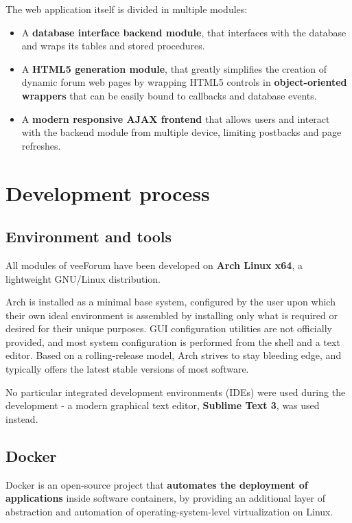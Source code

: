 \documentclass[12pt]{report}
\newcommand{\+}{\discretionary{\mbox{\scriptsize$\hookleftarrow$}}{}{}}
\renewcommand\emph{\textbf}
\begin{document}
        The web application itself is divided in multiple modules:
        \begin{itemize}
            \item A \emph{database interface backend module}, that interfaces with the database and wraps its tables and stored procedures.
            \item A \emph{HTML5 generation module}, that greatly simplifies the creation of dynamic forum web pages by wrapping HTML5 controls in \emph{object-oriented wrappers} that can be easily bound to callbacks and database events.
            \item A \emph{modern responsive AJAX frontend} that allows users and interact with the backend module from multiple device, limiting postbacks and page refreshes.
        \end{itemize}

        \chapter{Development process}

            \section{Environment and tools}
                All modules of veeForum have been developed on \emph{Arch Linux x64}, a lightweight GNU/Linux distribution.

                Arch is installed as a minimal base system, configured by the user upon which their own ideal environment is assembled by installing only what is required or desired for their unique purposes. GUI configuration utilities are not officially provided, and most system configuration is performed from the shell and a text editor. Based on a rolling-release model, Arch strives to stay bleeding edge, and typically offers the latest stable versions of most software.

                No particular integrated development environments (IDEs) were used during the development - a modern graphical text editor, \emph{Sublime Text 3}, was used instead.

            \section{Docker}
                Docker is an open-source project that \emph{automates the deployment of applications} inside software containers, by providing an additional layer of abstraction and automation of operating-system-level virtualization on Linux.
\end{document}

